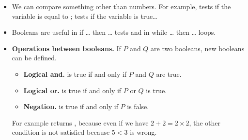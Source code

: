\documentclass[11pt,class=report,crop=false]{standalone}
\begin{document}
\begin{cours}[Booleans]
\begin{itemize}
  \item We can compare something other than numbers. For example,  
  \og{}\fg{} tests if the variable  is equal to ; \og{}\fg{} tests if the variable  is true\ldots
  
  \item Booleans are useful in \og{}if \ldots{} then \ldots\fg{} tests and in \og{}while \ldots{} then \ldots\fg{} loops.
  
  \item \textbf{Operations between booleans.}
  If $P$ and $Q$ are two booleans, new booleans can be defined.
  \begin{itemize}
    \item \textbf{Logical and.}\quad\og{}\fg{} is true if and only if $P$ and $Q$ are true.
    	\item \textbf{Logical or.}\quad \og{}\fg{} is true if and only if $P$ or $Q$ is true.
    	\item \textbf{Negation.}\quad \og{}\fg{} is true if and only if $P$ is false.
  \end{itemize}  
  
  For example \og{}\fg{} returns , because
  even if we have $2+2 = 2 \times 2$, the other condition is not satisfied because $5 < 3$ is wrong.
  
  
  
\end{itemize}
\end{cours}




\end{document}
